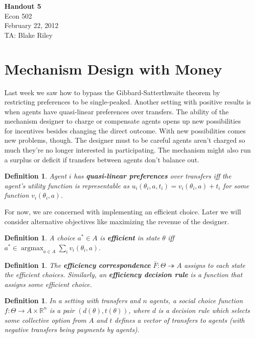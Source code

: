 \documentclass[letter, 10pt]{article}
\newtheorem{definition}[theorem]{Definition}
\theoremstyle{definition}
\newcommand{\R}{\mathbb{R}}
\newcommand{\tto}{\twoheadrightarrow}
\begin{document}
\begin{spacing}{1.1}

\noindent
\textbf{Handout 5} \\
Econ 502 \\
February 22, 2012 \\
TA: Blake Riley \\

\section{Mechanism Design with Money}
\label{sec:vick-clarke-grov}

Last week we saw how to bypass the Gibbard-Satterthwaite theorem by
restricting preferences to be single-peaked. Another setting with positive
results is when agents have quasi-linear preferences over transfers. The
ability of the mechanism designer to charge or compensate agents opens up
new possibilities for incentives besides changing the direct outcome. With
new possibilities comes new problems, though. The designer must to be
careful agents aren't charged so much they're no longer interested in
participating. The mechanism might also run a surplus or deficit if
transfers between agents don't balance out.

\begin{definition}
  Agent $i$ has \textbf{quasi-linear preferences} over transfers iff the
  agent's utility function is representable as $u_i(\theta_i, a, t_i) =
  v_i(\theta_i,a)+t_i$ for some function $v_i(\theta_i,a)$.
\end{definition}

For now, we are concerned with implementing an efficient choice. Later we
will consider alternative objectives like maximizing the revenue of the
designer.

\begin{definition}
  A choice $a^* \in A$ is \textbf{efficient} in state $\theta$ iff $a^* \in
  \operatorname{argmax}_{a\in A} \sum_i v_i(\theta_i, a)$.
\end{definition}

\begin{definition}
  The \textbf{efficiency correspondence} $\bar{F}:\Theta \tto A$ assigns to
  each state the efficient choices. Similarly, an \textbf{efficiency
    decision rule} is a function that assigns some efficient choice.
\end{definition}

\begin{definition}
  In a setting with transfers and $n$ agents, a social choice function
  $f:\Theta \to A\times \R^n$ is a pair $(d(\theta), t(\theta))$, where $d$
  is a decision rule which selects some collective option from $A$ and $t$
  defines a vector of transfers to agents (with negative transfers being
  payments by agents).
\end{definition}


\end{spacing}
\end{document}
